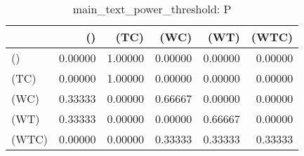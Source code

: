 \begin{table}
\centering
\caption{main_text_power_threshold: P}
\begin{tabular}{lrrrrr}
\toprule
{} &      () &    (TC) &    (WC) &    (WT) &   (WTC) \\
\midrule
()    & 0.00000 & 1.00000 & 0.00000 & 0.00000 & 0.00000 \\
(TC)  & 0.00000 & 1.00000 & 0.00000 & 0.00000 & 0.00000 \\
(WC)  & 0.33333 & 0.00000 & 0.66667 & 0.00000 & 0.00000 \\
(WT)  & 0.33333 & 0.00000 & 0.00000 & 0.66667 & 0.00000 \\
(WTC) & 0.00000 & 0.00000 & 0.33333 & 0.33333 & 0.33333 \\
\bottomrule
\end{tabular}
\end{table}

